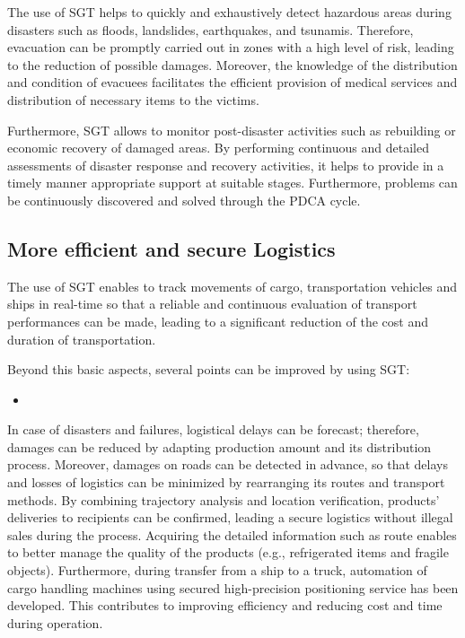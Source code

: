 \tab The use of SGT helps to quickly and exhaustively detect hazardous areas during disasters such as floods, landslides, earthquakes, and tsunamis. Therefore, evacuation can be promptly carried out in zones with a high level of risk, leading to the reduction of possible damages. Moreover, the knowledge of the distribution and condition of evacuees facilitates the efficient provision of medical services and distribution of necessary items to the victims.

Furthermore, SGT allows to monitor post-disaster activities such as rebuilding or economic recovery of damaged areas. By performing continuous and detailed assessments of disaster response and recovery activities, it helps to provide in a timely manner appropriate support at suitable stages. Furthermore, problems can be continuously discovered and solved through the PDCA cycle.

\subsection{More efficient and secure Logistics}

\tab The use of SGT enables to track movements of cargo, transportation vehicles and ships in real-time so that a reliable and continuous evaluation of transport performances can be made, leading to a significant reduction of the cost and duration of transportation.

Beyond this basic aspects, several points can be improved by using SGT:

\begin{itemize}

\item 

\end{itemize}
In case of disasters and failures, logistical delays can be forecast; therefore, damages can be reduced by adapting production amount and its distribution process. Moreover, damages on roads can be detected in advance, so that delays and losses of logistics can be minimized by rearranging its routes and transport methods. By combining trajectory analysis and location verification, products’ deliveries to recipients can be confirmed, leading a secure logistics without illegal sales during the process. Acquiring the detailed information such as route enables to better manage the quality of the products (e.g., refrigerated items and fragile objects). Furthermore, during transfer from a ship to a truck, automation of cargo handling machines using secured high-precision positioning service has been developed. This contributes to improving efficiency and reducing cost and time during operation.

